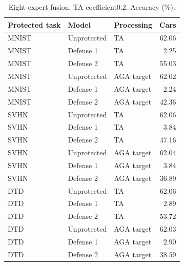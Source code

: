 \begin{table}[t]
\centering\small
\caption{Eight-expert fusion, TA coefficient0.2. Accuracy (\%).}
\begin{tabular}{lllr}
\toprule
Protected task & Model & Processing & Cars \\
\midrule
MNIST & Unprotected & TA & 62.06 \\
MNIST & Defense 1 & TA & 2.25 \\
MNIST & Defense 2 & TA & 55.03 \\
MNIST & Unprotected & AGA target & 62.02 \\
MNIST & Defense 1 & AGA target & 2.24 \\
MNIST & Defense 2 & AGA target & 42.36 \\
SVHN & Unprotected & TA & 62.06 \\
SVHN & Defense 1 & TA & 3.84 \\
SVHN & Defense 2 & TA & 47.16 \\
SVHN & Unprotected & AGA target & 62.04 \\
SVHN & Defense 1 & AGA target & 3.84 \\
SVHN & Defense 2 & AGA target & 36.89 \\
DTD & Unprotected & TA & 62.06 \\
DTD & Defense 1 & TA & 2.89 \\
DTD & Defense 2 & TA & 53.72 \\
DTD & Unprotected & AGA target & 62.03 \\
DTD & Defense 1 & AGA target & 2.90 \\
DTD & Defense 2 & AGA target & 38.59 \\
\bottomrule
\end{tabular}
\end{table}
